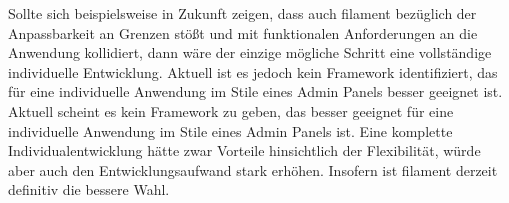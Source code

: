 Sollte sich beispielsweise in Zukunft zeigen, dass auch filament bezüglich der Anpassbarkeit an Grenzen stößt und mit funktionalen Anforderungen an die Anwendung kollidiert, dann wäre der einzige mögliche Schritt eine vollständige individuelle Entwicklung.
Aktuell ist es jedoch kein Framework identifiziert, das für eine individuelle Anwendung im Stile eines Admin Panels besser geeignet ist.
Aktuell scheint es kein Framework zu geben, das besser geeignet für eine individuelle Anwendung im Stile eines Admin Panels ist.
Eine komplette Individualentwicklung hätte zwar Vorteile hinsichtlich der Flexibilität, würde aber auch den Entwicklungsaufwand stark erhöhen.
Insofern ist filament derzeit definitiv die bessere Wahl.
